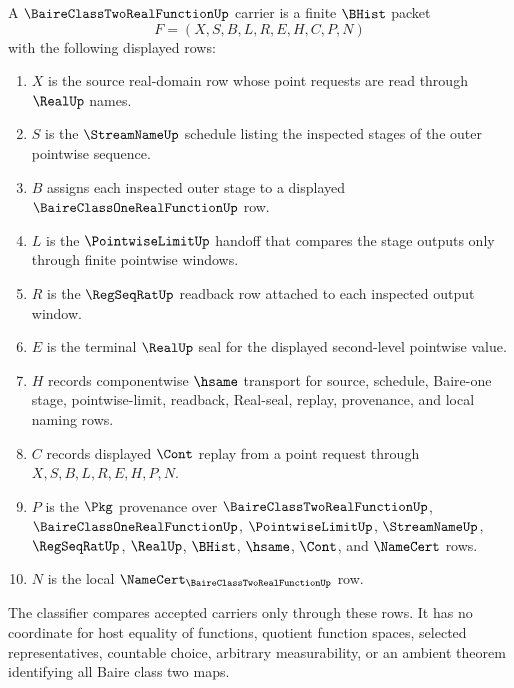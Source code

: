 \begin{definition}
\label{def:baire-class-two-real-function-carrier}
A $\BaireClassTwoRealFunctionUp$ carrier is a finite $\BHist$ packet
$$
F=(X,S,B,L,R,E,H,C,P,N)
$$
with the following displayed rows:
\begin{enumerate}
\item $X$ is the source real-domain row whose point requests are read through $\RealUp$ names.
\item $S$ is the $\StreamNameUp$ schedule listing the inspected stages of the outer pointwise sequence.
\item $B$ assigns each inspected outer stage to a displayed $\BaireClassOneRealFunctionUp$ row.
\item $L$ is the $\PointwiseLimitUp$ handoff that compares the stage outputs only through finite pointwise windows.
\item $R$ is the $\RegSeqRatUp$ readback row attached to each inspected output window.
\item $E$ is the terminal $\RealUp$ seal for the displayed second-level pointwise value.
\item $H$ records componentwise $\hsame$ transport for source, schedule, Baire-one stage, pointwise-limit, readback, Real-seal, replay, provenance, and local naming rows.
\item $C$ records displayed $\Cont$ replay from a point request through $X,S,B,L,R,E,H,P,N$.
\item $P$ is the $\Pkg$ provenance over $\BaireClassTwoRealFunctionUp$, $\BaireClassOneRealFunctionUp$, $\PointwiseLimitUp$, $\StreamNameUp$, $\RegSeqRatUp$, $\RealUp$, $\BHist$, $\hsame$, $\Cont$, and $\NameCert$ rows.
\item $N$ is the local $\NameCert_{\BaireClassTwoRealFunctionUp}$ row.
\end{enumerate}
The classifier compares accepted carriers only through these rows. It has no coordinate for host equality of functions, quotient function spaces, selected representatives, countable choice, arbitrary measurability, or an ambient theorem identifying all Baire class two maps.
\end{definition}

